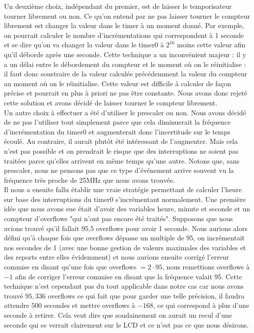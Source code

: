 \documentclass[12pt,a4paper]{article}
\begin{document}
    Un deuxième choix, indépendant du premier, est de laisser le temporisateur tourner librement ou non. Ce qu'on entend par ne pas laisser tourner le compteur librement est changer la valeur dans le timer à un moment donné. Par exemple, on pourrait calculer le nombre d'incrémentations qui correspondent à 1 seconde et se dire qu'on va changer la valeur dans le timer0 à $2^{16}$ moins cette valeur afin qu'il déborde après une seconde. Cette technique a un inconvénient majeur : il y a un délai entre le débordement du compteur et le moment où on le réinitialise : il faut donc soustraire de la valeur calculée précédemment la valeur du compteur au moment où on le réinitialise. Cette valeur est difficile à calculer de façon précise et pourrait en plus à priori ne pas être constante. Nous avons donc rejeté cette solution et avons décidé de laisser tourner le compteur librement.\\
    
    Un autre choix à effectuer a été d'utiliser le prescaler ou non. Nous avons décidé de ne pas l'utiliser tout simplement parce que cela diminuerait la fréquence d'incrémentation du timer0 et augmenterait donc l'incertitude sur le temps écoulé. Au contraire, il aurait plutôt été intéressant de l'augmenter. Mais cela n'est pas possible et on prendrait le risque que des interruptions ne soient pas traitées parce qu'elles arrivent en même temps qu'une autre. Notons que, sans prescaler, nous ne pensons pas que ce type d'événement arrive souvent vu la fréquence très proche de \unit{25}{MHz} que nous avons trouvée. \\
    
    Il nous a ensuite fallu établir une vraie stratégie permettant de calculer l'heure sur base des interruptions du timer0 s'incrémentant normalement. Une première idée que nous avons eue était d'avoir des variables heure, minute et seconde et un compteur d'overflows "qui n'ont pas encore été traités". Supposons que nous avions trouvé qu'il fallait 95,5 overflows pour avoir 1 seconde. Nous aurions alors défini qu'à chaque fois que overflows dépasse un multiple de $95$, on incrémentait nos secondes de 1 (avec une bonne gestion de valeurs maximales des variables et des reports entre elles évidemment) et nous aurions ensuite corrigé l'erreur commise en disant qu'une fois que overflows $= 2\cdot 95$, nous remettions overflows à $-1$ afin de corriger l'erreur commise en disant que la fréquence valait 95. Cette technique n'est cependant pas du tout applicable dans notre cas car nous avons trouvé $95,336$ overflows ce qui fait que pour garder une telle précision, il faudra attendre $500$ secondes et mettre overflows à $-168$, ce qui correspond à plus d'une seconde à retirer. Cela veut dire que soudainement on aurait un recul d'une seconde qui se verrait clairement sur le LCD et ce n'est pas ce que nous désirons.\\
    
\end{document}
